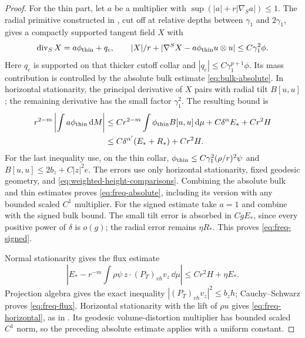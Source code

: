 \begin{proof}
For the thin part, let $a$ be a multiplier with
$\sup(|a|+r|\nabla_Sa|)\le1$. The radial primitive constructed in
\cite[Lemma~8.1, Equation~(8.11)]{AE}, cut off at relative depths
between $\gamma_1$ and $2\gamma_1$, gives a compactly supported
tangent field $X$ with
\[
 \operatorname{div}_SX=a\phi_{\rm thin}+q_c,\qquad
 |X|/r+|\nabla^SX-a\phi_{\rm thin}u\otimes u|
                                    \le C\gamma_1^2\phi.
\]
Here $q_c$ is supported on that thicker cutoff collar and
$|q_c|\le C\gamma_1^{p+1}\phi$. Its mass contribution is controlled
by the absolute bulk estimate \eqref{eq:bulk-absolute}. In horizontal
stationarity, the principal derivative of $X$ pairs with radial tilt
$B[u,u]$; the remaining derivative has the small factor $\gamma_1^2$.
The resulting bound is
\[
 \begin{aligned}
 r^{2-m}\left|\int a\phi_{\rm thin}\,\mathrm d M\right|
 &\le Cr^{2-m}\int\phi_{\rm thin}B[u,u]\,\mathrm d\mu
                  +C\delta^\alpha E_*+Cr^2H
 \\
 &\le C\delta^{\alpha'}(E_*+R_*)+Cr^2H.
 \end{aligned}
\]
For the last inequality use, on the thin collar,
$\phi_{\rm thin}\le C\gamma_1^2(\rho/r)^2\psi$ and
$B[u,u]\le2b_z+C|z|^2e$.
The errors use only horizontal stationarity, fixed geodesic
geometry, and \eqref{eq:weighted-height-comparisons}.
Combining the absolute bulk and thin estimates proves
\eqref{eq:freq-absolute}, including its version with any bounded
scaled $C^1$ multiplier. For the signed estimate take $a=1$ and
combine with the signed bulk bound. The small tilt error is absorbed
in $CgE_*$, since every positive power of $\delta$ is $o(g)$; the
radial error remains $\eta R_*$. This proves \eqref{eq:freq-signed}.

Normal stationarity gives the flux estimate
\[
 \left|E_*-r^{-m}\int\rho\psi\,
                    z\cdot(P_T)_{vh}v_z\,\dd\mu\right|
                       \le Cr^2H+\eta E_*.
\]
Projection algebra gives the exact inequality
$|(P_T)_{vh}v_z|^2\le b_zh$; Cauchy--Schwarz proves
\eqref{eq:freq-flux}. Horizontal stationarity with the lift of
$\rho u$ gives \eqref{eq:freq-horizontal}, as in
\cite[Lemma~8.2]{AE}. Its geodesic volume-distortion multiplier has
bounded scaled $C^1$ norm, so the preceding absolute estimate applies
with a uniform constant.


\end{proof}

